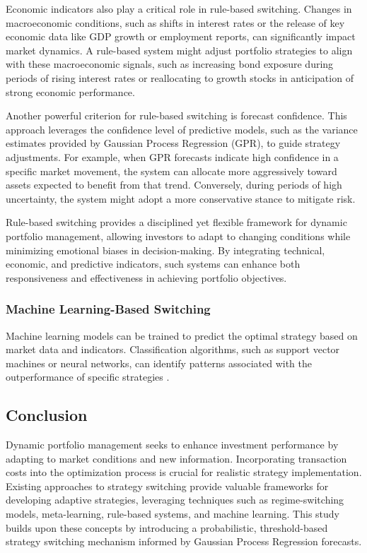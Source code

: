 Economic indicators also play a critical role in rule-based switching. Changes in macroeconomic conditions, such as shifts in interest rates or the release of key economic data like GDP growth or employment reports, can significantly impact market dynamics. A rule-based system might adjust portfolio strategies to align with these macroeconomic signals, such as increasing bond exposure during periods of rising interest rates or reallocating to growth stocks in anticipation of strong economic performance.

Another powerful criterion for rule-based switching is forecast confidence. This approach leverages the confidence level of predictive models, such as the variance estimates provided by Gaussian Process Regression (GPR), to guide strategy adjustments. For example, when \ac{GPR} forecasts indicate high confidence in a specific market movement, the system can allocate more aggressively toward assets expected to benefit from that trend. Conversely, during periods of high uncertainty, the system might adopt a more conservative stance to mitigate risk.

Rule-based switching provides a disciplined yet flexible framework for dynamic portfolio management, allowing investors to adapt to changing conditions while minimizing emotional biases in decision-making. By integrating technical, economic, and predictive indicators, such systems can enhance both responsiveness and effectiveness in achieving portfolio objectives.


\subsubsection{Machine Learning-Based Switching}

Machine learning models can be trained to predict the optimal strategy based on market data and indicators. Classification algorithms, such as support vector machines or neural networks, can identify patterns associated with the outperformance of specific strategies \cite{fernandez2018machine}.

\subsection{Conclusion}

Dynamic portfolio management seeks to enhance investment performance by adapting to market conditions and new information. Incorporating transaction costs into the optimization process is crucial for realistic strategy implementation. Existing approaches to strategy switching provide valuable frameworks for developing adaptive strategies, leveraging techniques such as regime-switching models, meta-learning, rule-based systems, and machine learning. This study builds upon these concepts by introducing a probabilistic, threshold-based strategy switching mechanism informed by Gaussian Process Regression forecasts.




